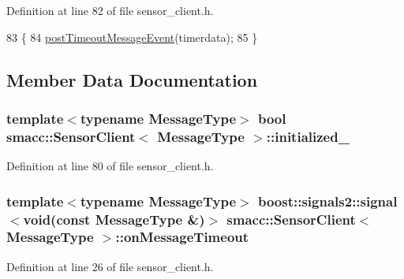 Definition at line 82 of file sensor\+\_\+client.\+h.


\begin{DoxyCode}
83   \{
84     \hyperlink{classsmacc_1_1SensorClient_ad2c6d9f2e7ceddac26024cd5901a6739}{postTimeoutMessageEvent}(timerdata);
85   \}
\end{DoxyCode}


\subsection{Member Data Documentation}
\subsubsection[{\texorpdfstring{initialized\+\_\+}{initialized_}}]{\setlength{\rightskip}{0pt plus 5cm}template$<$typename Message\+Type$>$ {\bf bool} {\bf smacc\+::\+Sensor\+Client}$<$ Message\+Type $>$\+::initialized\+\_\+\hspace{0.3cm}{\ttfamily [private]}}\hypertarget{classsmacc_1_1SensorClient_a7dde11291a16f6c2edaa02552895ee9e}{}\label{classsmacc_1_1SensorClient_a7dde11291a16f6c2edaa02552895ee9e}


Definition at line 80 of file sensor\+\_\+client.\+h.

\subsubsection[{\texorpdfstring{on\+Message\+Timeout}{onMessageTimeout}}]{\setlength{\rightskip}{0pt plus 5cm}template$<$typename Message\+Type$>$ boost\+::signals2\+::signal$<$void(const Message\+Type \&)$>$ {\bf smacc\+::\+Sensor\+Client}$<$ Message\+Type $>$\+::on\+Message\+Timeout}\hypertarget{classsmacc_1_1SensorClient_a3652c00d16a1a82ef6b43466ef360c72}{}\label{classsmacc_1_1SensorClient_a3652c00d16a1a82ef6b43466ef360c72}


Definition at line 26 of file sensor\+\_\+client.\+h.

